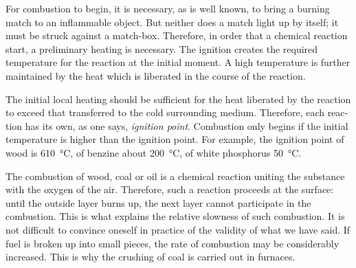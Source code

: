 For combustion to begin, it is necessary, as is well known, to bring a burning match to an inflammable object. But neither does a match light up by itself; it must be struck against a match-box. Therefore, in order that a chemical reaction start, a preliminary heating is necessary. The ignition creates the required temperature for the reaction at the initial moment. A high temperature is further maintained by the heat which is liberated in the course of the reaction.

The initial local heating should be sufficient for the heat liberated by the reaction to exceed that transferred to the cold surrounding medium. Therefore, each reac­tion has its own, as one says, \emph{ignition point}. 
Combustion only begins if the initial temperature is higher than the ignition point. For example, the ignition point of wood is \SI{610}{\celsius}, of benzine about \SI{200}{\celsius}, of white phosphorus \SI{50}{\celsius}.

The combustion of wood, coal or oil is a chemical reac­tion uniting the substance with the oxygen of the air. Therefore, such a reaction proceeds at the surface: until the outside layer burns up, the next layer cannot participate in the combustion. This is what explains the rela­tive slowness of such combustion. It is not difficult to convince oneself in practice of the validity of what we have said. If fuel is broken up into small pieces, the rate of combustion may be considerably increased. This is why the crushing of coal is carried out in furnaces.

